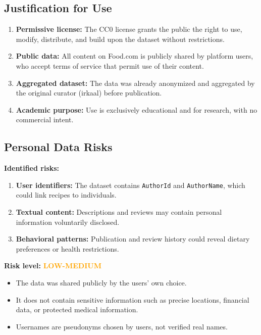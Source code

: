 \documentclass[11pt,a4paper]{article}
\begin{document}
\subsection{Justification for Use}

\begin{enumerate}
    \item \textbf{Permissive license:} The CC0 license grants the public the right to use, modify, distribute, and build upon the dataset without restrictions.

    \item \textbf{Public data:} All content on Food.com is publicly shared by platform users, who accept terms of service that permit use of their content.

    \item \textbf{Aggregated dataset:} The data was already anonymized and aggregated by the original curator (irkaal) before publication.

    \item \textbf{Academic purpose:} Use is exclusively educational and for research, with no commercial intent.
\end{enumerate}

\subsection{Personal Data Risks}

\textbf{Identified risks:}

\begin{enumerate}
    \item \textbf{User identifiers:} The dataset contains \texttt{AuthorId} and \texttt{AuthorName}, which could link recipes to individuals.

    \item \textbf{Textual content:} Descriptions and reviews may contain personal information voluntarily disclosed.

    \item \textbf{Behavioral patterns:} Publication and review history could reveal dietary preferences or health restrictions.
\end{enumerate}

\textbf{Risk level:} \textcolor{orange}{\textbf{LOW-MEDIUM}}

\begin{itemize}
    \item The data was shared publicly by the users' own choice.
    \item It does not contain sensitive information such as precise locations, financial data, or protected medical information.
    \item Usernames are pseudonyms chosen by users, not verified real names.
\end{itemize}
\end{document}
